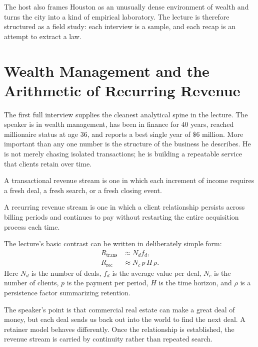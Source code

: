 The host also frames Houston as an unusually dense environment of wealth and turns the city into a kind of empirical laboratory. The lecture is therefore structured as a field study: each interview is a sample, and each recap is an attempt to extract a law.

\section{Wealth Management and the Arithmetic of Recurring Revenue}

The first full interview supplies the cleanest analytical spine in the lecture. The speaker is in wealth management, has been in finance for \(40\) years, reached millionaire status at age \(36\), and reports a best single year of \(\$6\) million. More important than any one number is the structure of the business he describes. He is not merely chasing isolated transactions; he is building a repeatable service that clients retain over time.

\begin{definition}
A transactional revenue stream is one in which each increment of income requires a fresh deal, a fresh search, or a fresh closing event.
\end{definition}

\begin{definition}
A recurring revenue stream is one in which a client relationship persists across billing periods and continues to pay without restarting the entire acquisition process each time.
\end{definition}

The lecture's basic contrast can be written in deliberately simple form:
\begin{align}
R_{\text{trans}} &\approx N_d f_d, \\
R_{\text{rec}} &\approx N_c\,p\,H\,\rho.
\end{align}
Here \(N_d\) is the number of deals, \(f_d\) is the average value per deal, \(N_c\) is the number of clients, \(p\) is the payment per period, \(H\) is the time horizon, and \(\rho\) is a persistence factor summarizing retention.

The speaker's point is that commercial real estate can make a great deal of money, but each deal sends us back out into the world to find the next deal. A retainer model behaves differently. Once the relationship is established, the revenue stream is carried by continuity rather than repeated search.

